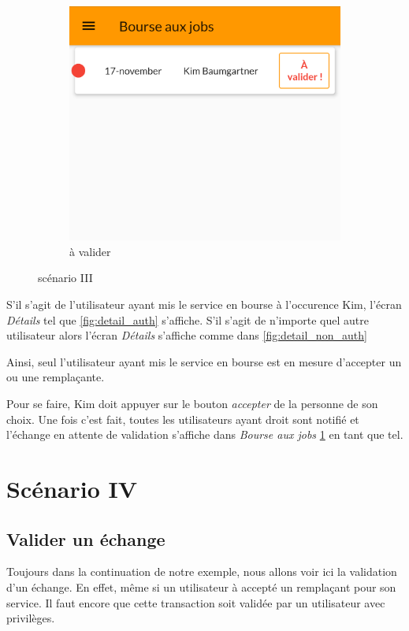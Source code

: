\begin{figure}[!h]
\begin{subfigure}{.3\textwidth}
        \end{subfigure}
        \begin{subfigure}{.3\textwidth}
            \centering
            \includegraphics[width=0.9\linewidth]{screenshots/scenario_03/a_valider.png}
            \caption{à valider}
            \label{fig:a_valider}
        \end{subfigure}
        \caption{scénario III}
        \label{fig:scen03}
    \end{figure}

    S'il s'agit de l'utilisateur ayant mis le service en bourse à l'occurence Kim, l'écran \textit{Détails} tel que \ref{fig:detail_auth} s'affiche.
    S'il s'agit de n'importe quel autre utilisateur alors l'écran \textit{Détails} s'affiche comme dans \ref{fig:detail_non_auth}

    Ainsi, seul l'utilisateur ayant mis le service en bourse est en mesure d'accepter un ou une remplaçante. 
    
    Pour se faire, Kim doit appuyer sur le bouton \textit{accepter} de la personne de son choix. Une fois c'est fait, toutes les utilisateurs ayant droit sont notifié
    et l'échange en attente de validation s'affiche dans \textit{Bourse aux jobs} \ref{fig:a_valider} en tant que tel.

\section[Valider un échange - Scénario IV]{Scénario IV}
    \subsection*{Valider un échange}
    Toujours dans la continuation de notre exemple, nous allons voir ici 
    la validation d'un échange. En effet, même si un utilisateur
    à accepté un remplaçant pour son service. Il faut encore que cette
    transaction soit validée par un utilisateur avec privilèges.

